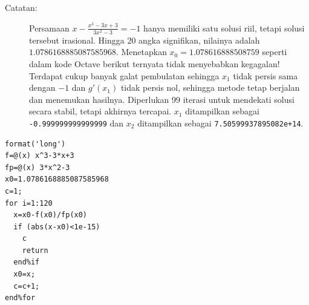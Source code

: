 \begin{description}
\begin{description}
\item [{Catatan:}] Persamaan $x-\frac{x^{3}-3x+3}{3x^{2}-3}=-1$ hanya
memiliki satu solusi riil, tetapi solusi tersebut irasional. Hingga
20 angka signifikan, nilainya adalah $1.0786168885087585968$. Menetapkan
$x_{0}=1.078616888508759$ seperti dalam kode Octave berikut ternyata
tidak menyebabkan kegagalan! Terdapat cukup banyak galat pembulatan
sehingga $x_{1}$ tidak persis sama dengan $-1$ dan $g'(x_{1})$
tidak persis nol, sehingga metode tetap berjalan dan menemukan hasilnya.
Diperlukan 99 iterasi untuk mendekati solusi secara stabil, tetapi
akhirnya tercapai. $x_{1}$ ditampilkan sebagai \texttt{-0.999999999999999}
dan $x_{2}$ ditampilkan sebagai \texttt{7.50599937895082e+14}.
\end{description}
\begin{verbatim}
format('long')
f=@(x) x^3-3*x+3
fp=@(x) 3*x^2-3
x0=1.0786168885087585968
c=1;
for i=1:120
  x=x0-f(x0)/fp(x0)
  if (abs(x-x0)<1e-15)
    c
    return
  end%if
  x0=x;
  c=c+1;
end%for
\end{verbatim}
\end{description}

